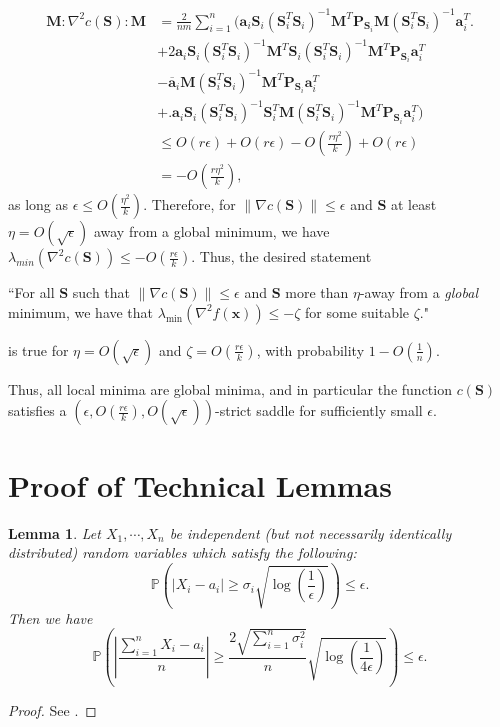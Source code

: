 \documentclass[twoside,11pt]{article}
\newcommand{\md}[1]{\mathbb{#1}}
\newtheorem{lem}{Lemma}
\begin{document}
\begin{align*}
\bm{M} : \nabla ^2 c(\bm{S}): \bm{M}&= \frac{2}{nm} \sum_{i=1}^n \biggl( \bm{a}_i\bm{S}_i(\bm{S}_i^T\bm{S}_i)^{-1}\bm{M}^T\bm{P}_{\bm{S}_i}\bm{M} (\bm{S}_i^T\bm{S}_i)^{-1}\bm{a}_i^T\biggr.\\&+2\bm{a}_i\bm{S}_i(\bm{S}_i^T\bm{S}_i)^{-1}\bm{M}^T\bm{S}_i(\bm{S}_i^T\bm{S}_i)^{-1}\bm{M}^T\bm{P}_{\bm{S}_i}\bm{a}_i^T\\& -  \overline{\bm{a}}_i \bm{M}(\bm{S}_i^T\bm{S}_i)^{-1}\bm{M}^T \bm{P}_{\bm{S}_i} \bm{a}_i^T\\&+\biggl.\bm{a}_i\bm{S}_i(\bm{S}_i^T\bm{S}_i)^{-1} \bm{S}^T_i\bm{M}(\bm{S}_i^T\bm{S}_i)^{-1}\bm{M}^T\bm{P}_{\bm{S}_i}\bm{a}_i^T\biggr)\\&\leq O(r\epsilon)+O(r\epsilon)-O\left(\frac{r\eta^2}{k}\right)+O(r\epsilon)\\&=
-O\left(\frac{r\eta^2}{k}\right),
\end{align*}
as long as $\epsilon\leq O(\frac{\eta^2}{k})$. Therefore, for $\|\nabla c(\bm{S})\|\leq \epsilon $ and $\bm{S}$ at least $\eta = O(\sqrt{\epsilon})$ away from a global minimum, we have $\lambda_{min}(\nabla^2 c(\bm{S}))\leq -O(\frac{r\epsilon}{k})$. Thus, the desired statement

``For all $\bm{S}$ such that $\|\nabla c(\bm{S})\|\leq \epsilon$ and $\bm{S}$ more than $\eta$-away from a \emph{global} minimum, we have that $\lambda_{\text{min}}(\nabla^2f(\bm{x}))\leq -\zeta$ for some suitable $\zeta$."

is true for $\eta = O(\sqrt{\epsilon})$ and $\zeta = O(\frac{r\epsilon}{k})$, with probability $1-O(\frac{1}{n})$. 


Thus, all local minima are global minima, and in particular the function $c(\bm{S})$ satisfies a $(\epsilon, O(\frac{r\epsilon}{k}), O(\sqrt{\epsilon}))$-strict saddle for sufficiently small $\epsilon$. 
\vfill
\pagebreak

\section{Proof of Technical Lemmas}
\begin{lem}
	\label{lem:hoeffding_general}
	Let $X_1,\cdots,X_n$ be independent (but not necessarily identically distributed) random variables which satisfy the following:
	\begin{equation*}
	\md{P}\left(|X_i-a_i|\geq \sigma_i \sqrt{\log(\frac{1}{\epsilon})}\right)\leq \epsilon .
	\end{equation*}
	Then we have 
	\begin{equation}
	\md{P}\left(\left|\frac{\sum_{i=1}^n X_i-a_i}{n}\right|\geq \frac{2\sqrt{\sum_{i=1}^n \sigma_i^2}}{n}\sqrt{\log(\frac{1}{4\epsilon})}\right)\leq \epsilon.
	\end{equation}
\end{lem}
\begin{proof}
	See \cite{bertsimas2018interpretable}.
\end{proof}
\end{document}
